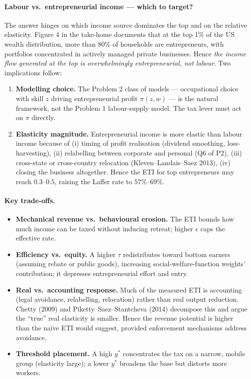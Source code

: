 \documentclass[11pt,a4paper]{article}
\begin{document}
\paragraph{Labour vs.\ entrepreneurial income --- which to target?}
The answer hinges on which income source dominates the top and on the relative elasticity. Figure 4 in the take-home documents that at the top 1\% of the US wealth distribution, more than 80\% of households are entrepreneurs, with portfolios concentrated in actively managed private businesses. Hence \emph{the income flow generated at the top is overwhelmingly entrepreneurial, not labour}. Two implications follow:
\begin{enumerate}[leftmargin=*,itemsep=2pt]
    \item \textbf{Modelling choice.} The Problem 2 class of models --- occupational choice with skill $z$ driving entrepreneurial profit $\pi(z,w)$ --- is the natural framework, not the Problem 1 labour-supply model. The tax lever must act on $\pi$ directly.
    \item \textbf{Elasticity magnitude.} Entrepreneurial income is more elastic than labour income because of (i) timing of profit realisation (dividend smoothing, loss-harvesting), (ii) relabelling between corporate and personal (Q6 of P2), (iii) cross-state or cross-country relocation (Kleven--Landais--Saez 2013), (iv) closing the business altogether. Hence the ETI for top entrepreneurs may reach $0.3$--$0.5$, raising the Laffer rate to $57\%$--$69\%$.
\end{enumerate}

\paragraph{Key trade-offs.}
\begin{itemize}[leftmargin=*,itemsep=2pt]
    \item \textbf{Mechanical revenue vs.\ behavioural erosion.} The ETI bounds how much income can be taxed without inducing retreat; higher $\epsilon$ caps the effective rate.
    \item \textbf{Efficiency vs.\ equity.} A higher $\tau$ redistributes toward bottom earners (assuming rebate or public goods), increasing social-welfare-function weights' contribution; it depresses entrepreneurial effort and entry.
    \item \textbf{Real vs.\ accounting response.} Much of the measured ETI is accounting (legal avoidance, relabelling, relocation) rather than real output reduction. Chetty (2009) and Piketty--Saez--Stantcheva (2014) decompose this and argue the ``true'' real elasticity is smaller. Hence the revenue potential is higher than the naïve ETI would suggest, provided enforcement mechanisms address avoidance.
    \item \textbf{Threshold placement.} A high $y^{*}$ concentrates the tax on a narrow, mobile group (elasticity large); a lower $y^{*}$ broadens the base but distorts more workers.
\end{itemize}
\end{document}
